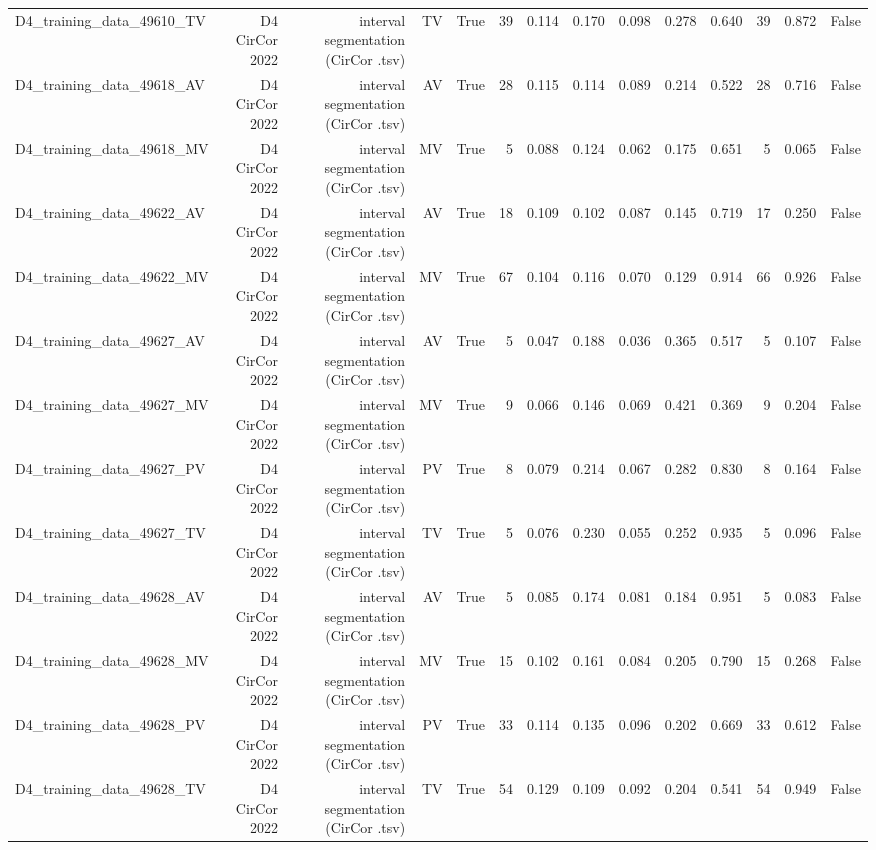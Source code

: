 \begin{table}[htbp]
\begin{tabular}{lrrrrrrrrrrrrr}
    D4\_training\_data\_49610\_TV & D4 CirCor 2022 & interval segmentation (CirCor .tsv) & TV & True & 39 & 0.114 & 0.170 & 0.098 & 0.278 & 0.640 & 39 & 0.872 & False \\
    D4\_training\_data\_49618\_AV & D4 CirCor 2022 & interval segmentation (CirCor .tsv) & AV & True & 28 & 0.115 & 0.114 & 0.089 & 0.214 & 0.522 & 28 & 0.716 & False \\
    D4\_training\_data\_49618\_MV & D4 CirCor 2022 & interval segmentation (CirCor .tsv) & MV & True & 5 & 0.088 & 0.124 & 0.062 & 0.175 & 0.651 & 5 & 0.065 & False \\
    D4\_training\_data\_49622\_AV & D4 CirCor 2022 & interval segmentation (CirCor .tsv) & AV & True & 18 & 0.109 & 0.102 & 0.087 & 0.145 & 0.719 & 17 & 0.250 & False \\
    D4\_training\_data\_49622\_MV & D4 CirCor 2022 & interval segmentation (CirCor .tsv) & MV & True & 67 & 0.104 & 0.116 & 0.070 & 0.129 & 0.914 & 66 & 0.926 & False \\
    D4\_training\_data\_49627\_AV & D4 CirCor 2022 & interval segmentation (CirCor .tsv) & AV & True & 5 & 0.047 & 0.188 & 0.036 & 0.365 & 0.517 & 5 & 0.107 & False \\
    D4\_training\_data\_49627\_MV & D4 CirCor 2022 & interval segmentation (CirCor .tsv) & MV & True & 9 & 0.066 & 0.146 & 0.069 & 0.421 & 0.369 & 9 & 0.204 & False \\
    D4\_training\_data\_49627\_PV & D4 CirCor 2022 & interval segmentation (CirCor .tsv) & PV & True & 8 & 0.079 & 0.214 & 0.067 & 0.282 & 0.830 & 8 & 0.164 & False \\
    D4\_training\_data\_49627\_TV & D4 CirCor 2022 & interval segmentation (CirCor .tsv) & TV & True & 5 & 0.076 & 0.230 & 0.055 & 0.252 & 0.935 & 5 & 0.096 & False \\
    D4\_training\_data\_49628\_AV & D4 CirCor 2022 & interval segmentation (CirCor .tsv) & AV & True & 5 & 0.085 & 0.174 & 0.081 & 0.184 & 0.951 & 5 & 0.083 & False \\
    D4\_training\_data\_49628\_MV & D4 CirCor 2022 & interval segmentation (CirCor .tsv) & MV & True & 15 & 0.102 & 0.161 & 0.084 & 0.205 & 0.790 & 15 & 0.268 & False \\
    D4\_training\_data\_49628\_PV & D4 CirCor 2022 & interval segmentation (CirCor .tsv) & PV & True & 33 & 0.114 & 0.135 & 0.096 & 0.202 & 0.669 & 33 & 0.612 & False \\
    D4\_training\_data\_49628\_TV & D4 CirCor 2022 & interval segmentation (CirCor .tsv) & TV & True & 54 & 0.129 & 0.109 & 0.092 & 0.204 & 0.541 & 54 & 0.949 & False \\

\end{tabular}
\end{table}
